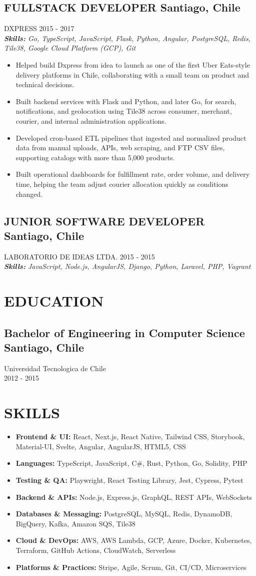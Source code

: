 \documentclass{article}
\newcommand{\SubHeading}[1]{
   \subsection*{#1}\vspace{-0.5em}
}
\newcommand{\WorkExperience}[2]{
   \subsection*{#1}
   \vspace{-1em}
   \uppercase{#2}
}
\newcommand{\Skills}[1]{
   \textit{\textbf{Skills:} #1}
}
\begin{document}
\WorkExperience{FULLSTACK DEVELOPER \hfill Santiago, Chile}{Dxpress \hfill 2015 {-} 2017} \\
\Skills{Go, TypeScript, JavaScript, Flask, Python, Angular, PostgreSQL, Redis, Tile38, Google Cloud Platform (GCP), Git}
\begin{itemize}
\item Helped build Dxpress from idea to launch as one of the first Uber Eats-style delivery platforms in Chile, collaborating with a small team on product and technical decisions.
\item Built backend services with Flask and Python, and later Go, for search, notifications, and geolocation using Tile38 across consumer, merchant, courier, and internal administration applications.
\item Developed cron-based ETL pipelines that ingested and normalized product data from manual uploads, APIs, web scraping, and FTP CSV files, supporting catalogs with more than 5,000 products.
\item Built operational dashboards for fulfillment rate, order volume, and delivery time, helping the team adjust courier allocation quickly as conditions changed.
\end{itemize}

\WorkExperience{JUNIOR SOFTWARE DEVELOPER \hfill Santiago, Chile}{Laboratorio de Ideas Ltda. \hfill 2015 {-} 2015} \\
\Skills{JavaScript, Node.js, AngularJS, Django, Python, Laravel, PHP, Vagrant}

\section*{EDUCATION}
\SubHeading{Bachelor of Engineering in Computer Science \hfill Santiago, Chile}
Universidad Tecnologica de Chile \\[0.1em]
2012 {-} 2015

\section*{SKILLS}
\begin{itemize}
	\item \textbf{Frontend \& UI:} React, Next.js, React Native, Tailwind CSS, Storybook, Material-UI, Svelte, Angular, AngularJS, HTML5, CSS
	\item \textbf{Languages:} TypeScript, JavaScript, C\#, Rust, Python, Go, Solidity, PHP
	\item \textbf{Testing \& QA:} Playwright, React Testing Library, Jest, Cypress, Pytest
	\item \textbf{Backend \& APIs:} Node.js, Express.js, GraphQL, REST APIs, WebSockets
	\item \textbf{Databases \& Messaging:} PostgreSQL, MySQL, Redis, DynamoDB, BigQuery, Kafka, Amazon SQS, Tile38
	\item \textbf{Cloud \& DevOps:} AWS, AWS Lambda, GCP, Azure, Docker, Kubernetes, Terraform, GitHub Actions, CloudWatch, Serverless
	\item \textbf{Platforms \& Practices:} Stripe, Agile, Scrum, Git, CI/CD, Microservices
\end{itemize}
\end{document}
